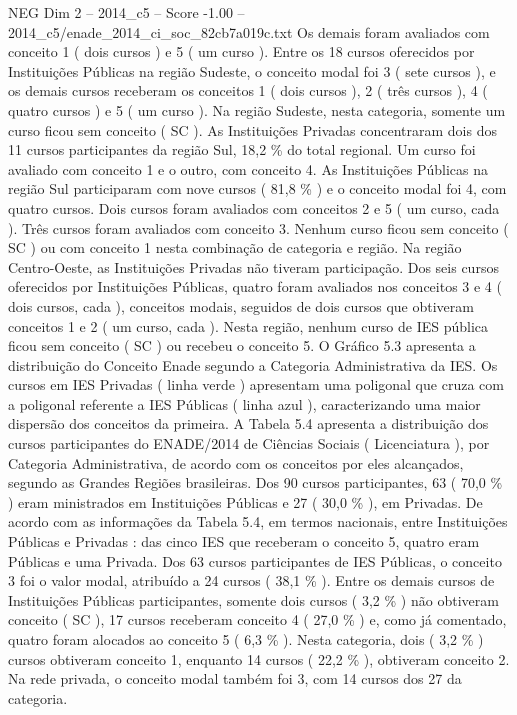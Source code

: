 \begin{textsample}{NEG Dim 2 – 2014\_c5 – Score -1.00 – 2014\_c5/enade\_2014\_ci\_soc\_82cb7a019c.txt}
Os demais foram avaliados com conceito 1 ( dois cursos ) e 5 ( um curso ).
Entre os 18 cursos oferecidos por Instituições Públicas na região Sudeste, o conceito modal foi 3 ( sete cursos ), e os demais cursos receberam os conceitos 1 ( dois cursos ), 2 ( três cursos ), 4 ( quatro cursos ) e 5 ( um curso ).
Na região Sudeste, nesta categoria, somente um curso ficou sem conceito ( SC ).
As Instituições Privadas concentraram dois dos 11 cursos participantes da região Sul, 18,2 \% do total regional.
Um curso foi avaliado com conceito 1 e o outro, com conceito 4.
As Instituições Públicas na região Sul participaram com nove cursos ( 81,8 \% ) e o conceito modal foi 4, com quatro cursos.
Dois cursos foram avaliados com conceitos 2 e 5 ( um curso, cada ).
Três cursos foram avaliados com conceito 3.
Nenhum curso ficou sem conceito ( SC ) ou com conceito 1 nesta combinação de categoria e região.
Na região Centro-Oeste, as Instituições Privadas não tiveram participação.
Dos seis cursos oferecidos por Instituições Públicas, quatro foram avaliados nos conceitos 3 e 4 ( dois cursos, cada ), conceitos modais, seguidos de dois cursos que obtiveram conceitos 1 e 2 ( um curso, cada ).
Nesta região, nenhum curso de IES pública ficou sem conceito ( SC ) ou recebeu o conceito 5.
O Gráfico 5.3 apresenta a distribuição do Conceito Enade segundo a Categoria Administrativa da IES.
Os cursos em IES Privadas ( linha verde ) apresentam uma poligonal que cruza com a poligonal referente a IES Públicas ( linha azul ), caracterizando uma maior dispersão dos conceitos da primeira.
A Tabela 5.4 apresenta a distribuição dos cursos participantes do ENADE/2014 de Ciências Sociais ( Licenciatura ), por Categoria Administrativa, de acordo com os conceitos por eles alcançados, segundo as Grandes Regiões brasileiras.
Dos 90 cursos participantes, 63 ( 70,0 \% ) eram ministrados em Instituições Públicas e 27 ( 30,0 \% ), em Privadas.
De acordo com as informações da Tabela 5.4, em termos nacionais, entre Instituições Públicas e Privadas : das cinco IES que receberam o conceito 5, quatro eram Públicas e uma Privada.
Dos 63 cursos participantes de IES Públicas, o conceito 3 foi o valor modal, atribuído a 24 cursos ( 38,1 \% ).
Entre os demais cursos de Instituições Públicas participantes, somente dois cursos ( 3,2 \% ) não obtiveram conceito ( SC ), 17 cursos receberam conceito 4 ( 27,0 \% ) e, como já comentado, quatro foram alocados ao conceito 5 ( 6,3 \% ).
Nesta categoria, dois ( 3,2 \% ) cursos obtiveram conceito 1, enquanto 14 cursos ( 22,2 \% ), obtiveram conceito 2.
Na rede privada, o conceito modal também foi 3, com 14 cursos dos 27 da categoria.

\end{textsample}

